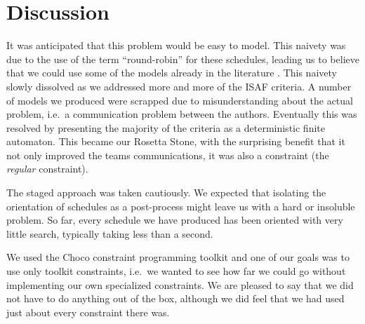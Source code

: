 \documentclass{llncs}
\begin{document}
\section{Discussion}
It was anticipated that this problem would be easy to model. This naivety was due to the use of the
term ``round-robin'' for these schedules, leading us to believe that we could use some of the models
already in the literature \cite{trick2002,trick2008,henz2004}. This naivety slowly dissolved as
we addressed more and more of the ISAF criteria. A number of models we produced were scrapped due to
misunderstanding about the actual problem, i.e.\ a communication problem between the authors.
Eventually this was resolved by presenting the majority of the criteria as a deterministic finite
automaton. This became our Rosetta Stone, with the surprising benefit that it not only improved the
teams communications, it was also a constraint (the \emph{regular} constraint).

The staged approach was taken cautiously. We expected that isolating the orientation of schedules as
a post-process might leave us with a hard or insoluble problem. So far, every schedule we have
produced has been oriented with very little search, typically taking less than a second.

We used the Choco constraint programming toolkit and one of our goals was to use only toolkit
constraints, i.e.\ we wanted to see how far we could go without implementing our own specialized
constraints. We are pleased to say that we did not have to do anything out of the box, although we
did feel that we had used just about every constraint there was.
\end{document}

